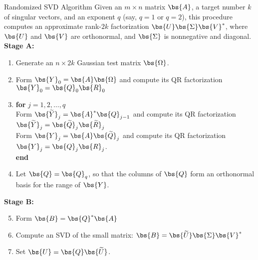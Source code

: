 \begin{frame}
 \fontsize{8pt}{10}\selectfont
  \begin{block}{Randomized SVD Algorithm\footnotemark}\pause
Given an $m\times n$ matrix $\bs{A}$, a target number $k$ of singular 
vectors, and an exponent $q$ (say, $q=1$ or $q=2$), this procedure computes an 
approximate rank-$2k$ factorization $\bs{U}\bs{\Sigma}\bs{V}^*$, where $\bs{U}$ 
and $\bs{V}$ are 
orthonormal, and $\bs{\Sigma}$ is nonnegative and diagonal.
\textbf{Stage A:}
\begin{enumerate}
  \item Generate an $n\times 2k$ Gaussian test matrix $\bs{\Omega}$.
  \item Form $\bs{Y}_0 = \bs{A}\bs{\Omega}$ and compute its QR factorization 
$\bs{Y}_0 = \bs{Q}_0\bs{R}_0$
  \item \textbf{for} $j = 1, 2, \dots, q$\\
  \hspace{.4cm} Form $\bs{\widetilde{Y}}_j = \bs{A}^*\bs{Q}_{j-1}$ and compute 
its QR factorization $\bs{\widetilde{Y}}_j = \bs{\widetilde{Q}}_j 
\bs{\widetilde{R}}_j$\\
  \hspace{.4cm} Form $\bs{Y}_j = \bs{A}\bs{\widetilde{Q}}_j$ and compute its QR 
factorization $\bs{Y}_j = \bs{Q}_j \bs{R}_j$.\\
  \textbf{end}
  \item Let $\bs{Q} = \bs{Q}_q$, so that the columns of $\bs{Q}$ form an 
orthonormal basis for the range of $\bs{Y}$.
\end{enumerate}
\textbf{Stage B:}
\begin{enumerate}
  \setcounter{enumi}{4}
  \item Form $\bs{B} = \bs{Q}^* \bs{A}$
  \item Compute an SVD of the small matrix: 
  $\bs{B} = \bs{\widetilde{U}} \bs{\Sigma} \bs{V}^*$
  \item Set $\bs{U} = \bs{Q}\bs{\widetilde{U}}$.
\end{enumerate}
  \end{block}
\end{frame}


